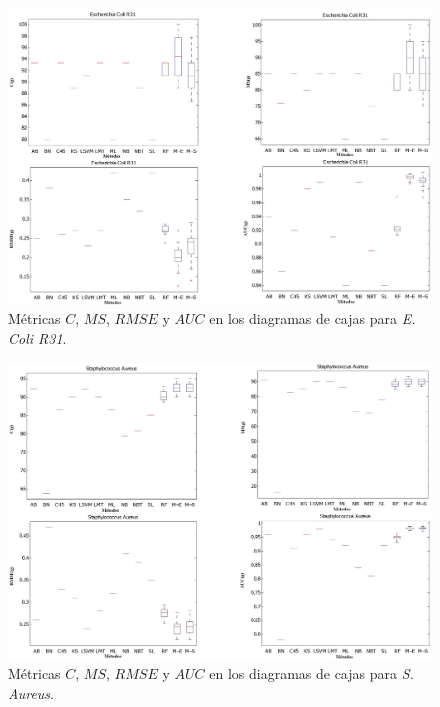 \begin{landscape}
\begin{figure}[!htb]
\centering
	\includegraphics[keepaspectratio,width=17cm]{figuras/BoxPlot_tanda2.jpg}
\caption{Métricas $C$, $MS$, $RMSE$ y $AUC$ en los diagramas de cajas para
\textit{E. Coli R31}.}
\label{fig2aplica}
\end{figure}
\end{landscape}

\begin{landscape}
\begin{figure}[!htb]
\centering
	\includegraphics[keepaspectratio,width=17cm]{figuras/BoxPlot_tanda3.jpg}
		\caption{Métricas $C$, $MS$, $RMSE$ y $AUC$ en los diagramas de cajas para
		\textit{S. Aureus}.}
\label{fig3aplica}
\end{figure}
\end{landscape}

